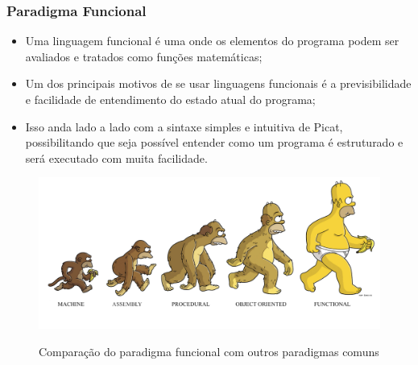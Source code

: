 \begin{frame}
	\frametitle{Paradigma Funcional}
    
    \begin{itemize}
    
    	\item Uma linguagem funcional é uma onde os elementos do programa podem ser avaliados e 
        tratados como funções matemáticas;
        
         \item Um dos principais motivos de se usar linguagens funcionais é a previsibilidade
         e facilidade de entendimento do estado atual do programa;
         
         \item Isso anda lado a lado com a sintaxe simples e intuitiva de Picat, possibilitando
         que seja possível entender como um programa é estruturado e será executado com muita
         facilidade.
         
    \end{itemize}
    
    \begin{figure}
    	\vspace*{-3mm}
        \centering
        \caption{Comparação do paradigma funcional com outros paradigmas comuns}
        \includegraphics[width=.7\textwidth] {figures/Paradigma_Funcional.png}
        \label{Paradigma Funcional}
    \end{figure}
    
\end{frame}


